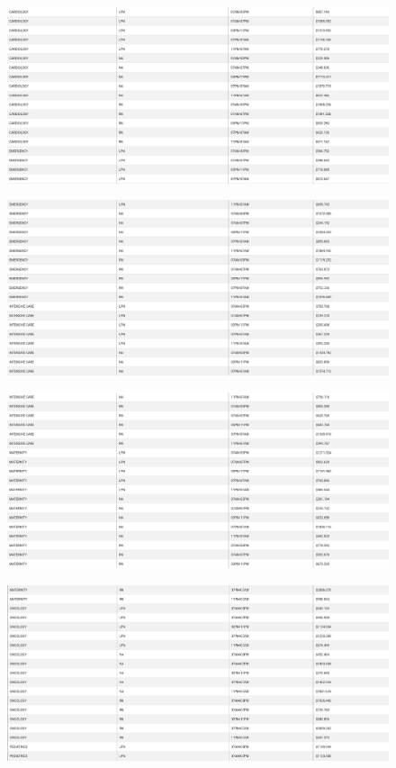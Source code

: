 \documentclass[11pt]{article}
\makeatletter
\def\maxwidth{\ifdim\Gin@nat@width>\linewidth\linewidth
    \else\Gin@nat@width\fi}
\let\Oldincludegraphics\includegraphics
\renewcommand{\includegraphics}[1]{\Oldincludegraphics[width=.8\maxwidth]{#1}}
\makeatother
\begin{document}
   \begin{figure}[H]
	\centering
	\includegraphics{7.png}
	\caption{}
\end{figure}


  \begin{figure}[H]
	\centering
	\includegraphics{8.png}
	\caption{}
\end{figure}

  \begin{figure}[H]
	\centering
	\includegraphics{9.png}
	\caption{}
\end{figure}

  \begin{figure}[H]
	\centering
	\includegraphics{10.png}
	\caption{}
\end{figure}
\end{document}
